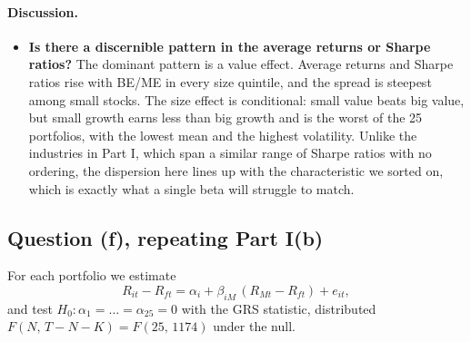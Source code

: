 \paragraph{Discussion.}
\begin{itemize}
\setlength{\itemsep}{4pt}\setlength{\parskip}{0pt}

\item \textbf{Is there a discernible pattern in the average returns or
Sharpe ratios?} The dominant pattern is a value effect. Average returns and
Sharpe ratios rise with BE/ME in every size quintile, and the spread is
steepest among small stocks. The size effect is conditional: small value
beats big value, but small growth earns less than big growth and is the
worst of the 25 portfolios, with the lowest mean and the highest
volatility. Unlike the industries in Part I, which span a similar range of Sharpe ratios with no ordering, the dispersion here lines up with the characteristic we sorted on, which is exactly what a single beta will struggle to match.

\end{itemize}

\subsection{Question (f), repeating Part I(b)}

For each portfolio we estimate
\[
R_{it} - R_{ft} = \alpha_i + \beta_{iM}\,(R_{Mt} - R_{ft}) + e_{it},
\]
and test $H_0:\alpha_1 = \dots = \alpha_{25} = 0$ with the GRS statistic,
distributed $F(N,\,T-N-K) = F(25,\,1174)$ under the null.

